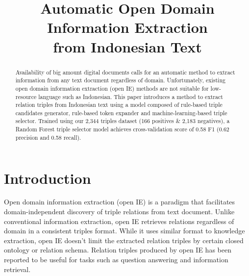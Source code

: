 \documentclass[conference,compsoc]{IEEEtran}
\begin{document}
\title{Automatic Open Domain Information Extraction\\from Indonesian Text}


\author{
	\and
}


\maketitle

\begin{abstract}

Availability of big amount digital documents calls for an automatic method to extract information from any text document regardless of domain. Unfortunately, existing open domain information extraction (open IE) methods are not suitable for low-resource language such as Indonesian. This paper introduces a method to extract relation triples from Indonesian text using a model composed of rule-based triple candidates generator, rule-based token expander and machine-learning-based triple selector. Trained using our 2,344 triples dataset (166 positives \& 2,183 negatives), a Random Forest triple selector model achieves cross-validation score of 0.58 F1 (0.62 precision and 0.58 recall).

\end{abstract}


\section{Introduction}

Open domain information extraction (open IE) is a paradigm that facilitates domain-independent discovery of triple relations from text document\cite{banko2007open}. Unlike conventional information extraction, open IE retrieves relations regardless of domain in a consistent triples format. While it uses similar format to knowledge extraction, open IE doesn't limit the extracted relation triples by certain closed ontology or relation schema\cite{auer2007dbpedia}. Relation triples produced by open IE has been reported to be useful for tasks such as question answering\cite{fader2011identifying} and information retrieval\cite{etzioni2011search}. 
\end{document}
